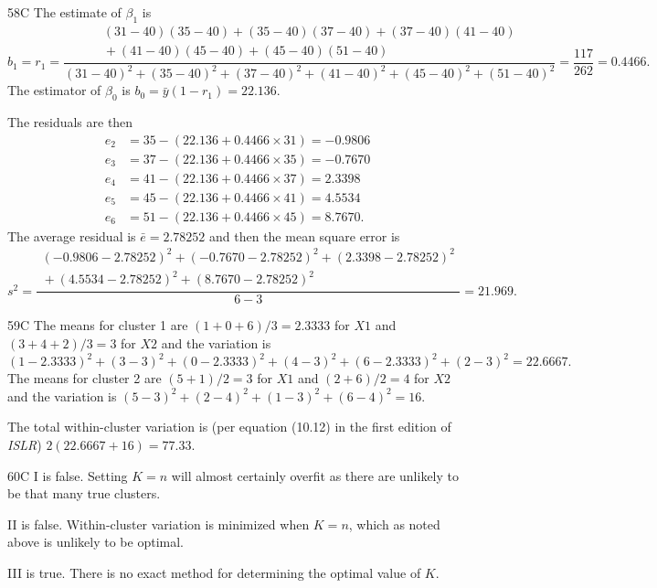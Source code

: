 \begin{solution}{58}{C}
The estimate of $\beta_1$ is
\[
b_1 = r_1 = \dfrac{\begin{array}{c}(31-40)(35-40) + (35-40)(37-40) + (37-40)(41-40) \\ {} + (41-40)(45-40) + (45-40)(51-40)\end{array}}{(31-40)^2 + (35-40)^2 + (37-40)^2 + (41-40)^2 + (45-40)^2 + (51-40)^2} = \dfrac{117}{262} = 0.4466.
\]
The estimator of $\beta_0$ is $b_0 = \bar{y}(1 - r_1) = 22.136$.

The residuals are then
\begin{align*}
e_2 &= 35 - (22.136 + 0.4466 \times 31) = -0.9806 \\
e_3 &= 37 - (22.136 + 0.4466 \times 35) = -0.7670 \\
e_4 &= 41 - (22.136 + 0.4466 \times 37) = 2.3398 \\
e_5 &= 45 - (22.136 + 0.4466 \times 41) = 4.5534 \\
e_6 &= 51 - (22.136 + 0.4466 \times 45) = 8.7670.
\end{align*}
The average residual is $\bar{e} = 2.78252$ and then the mean square error is
\[
s^2 = \dfrac{\begin{array}{c}(-0.9806 - 2.78252)^2 + (-0.7670 - 2.78252)^2 + (2.3398 - 2.78252)^2 \\ {} + (4.5534 - 2.78252)^2 + (8.7670 - 2.78252)^2\end{array}}{6 - 3} = 21.969.
\]
\end{solution}

\begin{solution}{59}{C}
The means for cluster 1 are $(1 + 0 + 6)/3 = 2.3333$ for $X1$ and $(3 + 4 + 2)/3 = 3$ for $X2$ and the variation is
\[
(1 - 2.3333)^2 + (3 - 3)^2 + (0 - 2.3333)^2 + (4 - 3)^2 + (6 - 2.3333)^2 + (2 - 3)^2 = 22.6667.
\]
The means for cluster 2 are $(5 + 1)/2 = 3$ for $X1$ and $(2 + 6)/2 = 4$ for $X2$ and the variation is $(5 - 3)^2 + (2 - 4)^2 + (1 - 3)^2 + (6 - 4)^2 = 16$.

The total within-cluster variation is (per equation (10.12) in the first edition of \textit{ISLR}) $2(22.6667 + 16) = 77.33$.
\end{solution}

\begin{solution}{60}{C}
I is false. Setting $K = n$ will almost certainly overfit as there are unlikely to be that many true clusters.

II is false. Within-cluster variation is minimized when $K = n$, which as noted above is unlikely to be optimal.

III is true. There is no exact method for determining the optimal value of $K$.
\end{solution}

